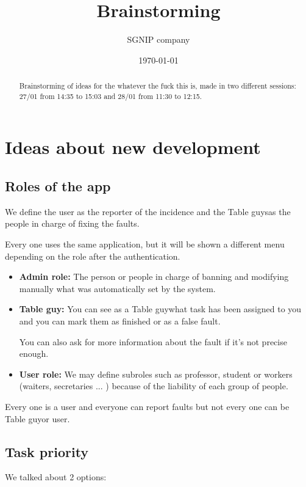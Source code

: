 \documentclass{article}
\title{Brainstorming}
\date{\today}
\author{SGNIP company}
\newcommand{\tbg}{Table guy}
\newcommand{\tbgs}{Table guys}
\begin{document}
\maketitle

\pagestyle{plain}

\begin{abstract} Brainstorming of ideas for the whatever the fuck this is, made in two different sessions: 27/01 from 14:35 to 15:03 and 28/01 from 11:30 to 12:15.
\end{abstract}

\section{Ideas about new development}

\subsection{Roles of the app}

We define the user as the reporter of the incidence and the \tbgs as the people in charge of fixing the faults.


Every one uses the same application, but it will be shown a different menu depending on the role after the authentication.

\begin{itemize}
\item \textbf{Admin role: } The person or people in charge of banning and modifying manually what was automatically set by the system.

\item\textbf{\tbg:} You can see as a \tbg what task has been assigned to you and you can mark them as finished or as a false fault.

You can also ask for more information about the fault if it's not precise enough.

\item \textbf{User role: }  We may define subroles such as professor, student or workers (waiters, secretaries ... ) because of the liability of each group of people.

\end{itemize}

Every one is a user and everyone can report faults but not  every one can be \tbg or user.

\subsection{Task priority}
We talked about 2 options:
\end{document}
